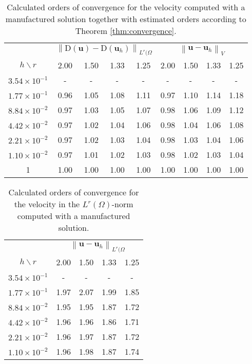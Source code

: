 \documentclass[onefignum,onetabnum]{siamart190516}
\newcommand{\bu}{\boldsymbol{u}}
\newcommand{\bD}{\boldsymbol{\mathrm{D}}}
\newcommand{\nrm}[1]{\left\lVert#1\right\rVert}
\begin{document}
\begin{table}
\centering
\caption{Calculated orders of convergence for the velocity computed with a manufactured solution together with estimated orders according to Theorem \ref{thm:convergence}.}
\label{table:orders}
	\begin{tabular}{c|cccc|cccc}
	\toprule
		& \multicolumn{4}{|c|}{$\nrm{\bD(\bu) - \bD(\bu_h)}_{L^r(\Omega}$} & \multicolumn{4}{c}{$\nrm{\bu - \bu_h}_V$} \\
		\cmidrule{2-9}
		$h \backslash r$ &2.00& 1.50& 1.33& 1.25 & 2.00& 1.50& 1.33& 1.25 \\
		\midrule
		$3.54 \times 10^{-1}$& - & - &- & - &- & - &- & - \\
		$1.77 \times 10^{-1}$& 0.96& 1.05& 1.08& 1.11& 0.97& 1.10& 1.14& 1.18\\
		$8.84 \times 10^{-2}$& 0.97& 1.03& 1.05& 1.07& 0.98& 1.06& 1.09& 1.12\\
		$4.42 \times 10^{-2}$& 0.97& 1.02& 1.04& 1.06& 0.98& 1.04& 1.06& 1.08\\
		$2.21 \times 10^{-2}$& 0.97& 1.02& 1.03& 1.04& 0.98& 1.03& 1.04& 1.06\\
		$1.10 \times 10^{-2}$& 0.97& 1.01& 1.02& 1.03& 0.98& 1.02& 1.03& 1.04\\
		\midrule
		1 & 1.00& 1.00 & 1.00 & 1.00 & 1.00& 1.00 & 1.00 & 1.00 \\ 
	\bottomrule
	\end{tabular}	
\end{table}

\begin{table}
\centering
\caption{Calculated orders of convergence for the velocity in the $L^r(\Omega)$-norm computed with a manufactured solution.}
\label{table:orders_vLr}
	\begin{tabular}{c|cccc}
	\toprule
		& \multicolumn{4}{|c|}{$\nrm{\bu - \bu_h}_{L^r(\Omega}$} \\
		\cmidrule{2-5}
		$h \backslash r$ &2.00& 1.50& 1.33& 1.25 \\
		\midrule
		$3.54 \times 10^{-1}$ &- & - &- & - \\
		$1.77 \times 10^{-1}$ & 1.97& 2.07& 1.99& 1.85\\
		$8.84 \times 10^{-2}$ & 1.95& 1.95& 1.87& 1.72\\
		$4.42 \times 10^{-2}$ & 1.96& 1.96& 1.86& 1.71\\
		$2.21 \times 10^{-2}$ & 1.96& 1.97& 1.87& 1.72\\
		$1.10 \times 10^{-2}$ & 1.96& 1.98& 1.87& 1.74\\
	\bottomrule
	\end{tabular}	
\end{table}
\end{document}
